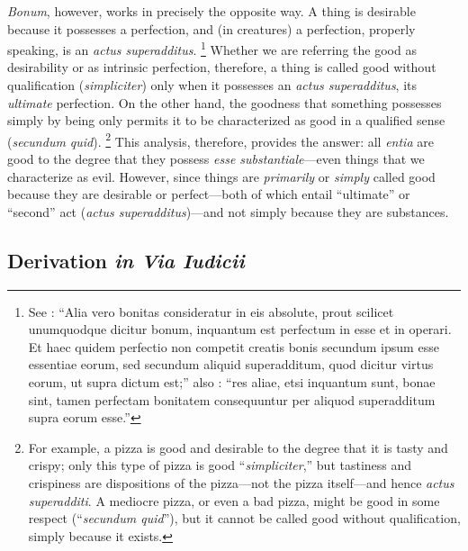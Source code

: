 \emph{Bonum}, however, works in precisely the opposite way. A thing is desirable because it possesses a perfection, and (in creatures) a perfection, properly speaking, is an \emph{actus superadditus}.%
%
\footnote{See \cite[lc.~4]{st:dehebdo}: “Alia vero bonitas consideratur in eis absolute, prout scilicet unumquodque dicitur bonum, inquantum est perfectum in esse et in operari. Et haec quidem perfectio non competit creatis bonis secundum ipsum esse essentiae eorum, sed secundum aliquid superadditum, quod dicitur virtus eorum, ut supra dictum est;” also \cite[IV, lc.~1, n.~269]{st:divnomin}: “res aliae, etsi inquantum sunt, bonae sint, tamen perfectam bonitatem consequuntur per aliquod superadditum supra eorum esse.”}
%
Whether we are referring the good as desirability or as intrinsic perfection, therefore, a thing is called good without qualification (\emph{simpliciter}) only when it possesses an \emph{actus superadditus}, its \emph{ultimate} perfection. On the other hand, the goodness that something possesses simply by being only permits it to be characterized as good in a qualified sense (\emph{secundum quid}).%
%
\footnote{For example, a pizza is good and desirable to the degree that it is tasty and crispy; only this type of pizza is good “\emph{simpliciter},” but tastiness and crispiness are dispositions of the pizza—not the pizza itself—and hence \emph{actus superadditi}. A mediocre pizza, or even a bad pizza, might be good in some respect (“\emph{secundum quid}”), but it cannot be called good without qualification, simply because it exists.} This analysis, therefore, provides the answer: all \emph{entia} are good to the degree that they possess \emph{esse substantiale}—even things that we characterize as evil. However, since things are \emph{primarily} or \emph{simply} called good because they are desirable or perfect—both of which entail “ultimate” or “second” act (\emph{actus superadditus})—and not simply because they are substances.

\subsection{Derivation \emph{in Via Iudicii}}

